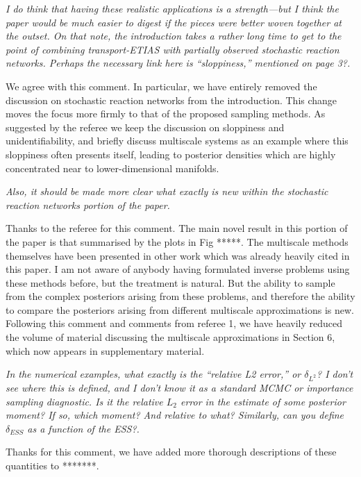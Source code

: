 \documentclass{article}
\newcommand{\comment}[2]{\vspace{0.6cm}{\bf Comment:} {\it #1.}

\vspace{0.3cm}{\bf Answer:} #2}
\begin{document}
\comment{I do think that having these realistic applications is a strength—but I think the paper would be much easier to digest if the pieces were better woven together at the outset. On that note, the introduction takes a rather long time to get to the point of combining transport-ETIAS with partially observed stochastic reaction networks. Perhaps the necessary link here is “sloppiness,” mentioned on page 3?}{We agree with this comment. In particular, we have entirely removed the discussion on stochastic reaction networks from the introduction. This change moves the focus more firmly to that of the proposed sampling methods. As suggested by the referee we keep the discussion on sloppiness and unidentifiability, and briefly discuss multiscale systems as an example where this sloppiness often presents itself, leading to posterior densities which are highly concentrated near to lower-dimensional manifolds.}



\comment{Also, it should be made more clear what exactly is new within the stochastic reaction networks portion of the paper}{Thanks to the referee for this comment. The main novel result in this portion of the paper is that summarised by the plots in Fig *****. The multiscale methods themselves have been presented in other work which was already heavily cited in this paper. I am not aware of anybody having formulated inverse problems using these methods before, but the treatment is natural. But the ability to sample from the complex posteriors arising from these problems, and therefore the ability to compare the posteriors arising from different multiscale approximations is new. Following this comment and comments from referee 1, we have heavily reduced the volume of material discussing the multiscale approximations in Section 6, which now appears in supplementary material.}


\comment{In the numerical examples, what exactly is the “relative L2 error,” or $\delta_{L^2}$? I don’t see where this is defined, and I don’t know it as a standard MCMC or importance sampling diagnostic. Is it the relative $L_2$ error in the estimate of some posterior moment? If so, which moment? And relative to what? Similarly, can you define $\delta_{ESS}$ as a function of the ESS?}{Thanks for this comment, we have added more thorough descriptions of these quantities to *******.}
\end{document}
